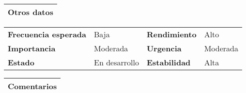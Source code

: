\documentclass[11pt,a4paper]{article}
\begin{document}
\begin{table}[H]
	\begin{tabularx}{\textwidth}{X}
		\textbf{Otros datos}\\ \hline
	\end{tabularx}
	
	\begin{tabularx}{\textwidth}{lXlX}
		\textbf{Frecuencia esperada} & Baja & \textbf{Rendimiento} & Alto\\
		\textbf{Importancia} & Moderada & \textbf{Urgencia} & Moderada \\
		\textbf{Estado} & En desarrollo & \textbf{Estabilidad} & Alta\\
	\end{tabularx}
	
	\begin{tabularx}{\textwidth}{X}
		\textbf{Comentarios}\\ \hline
	\end{tabularx}
\end{table}

\newpage


\end{document}
